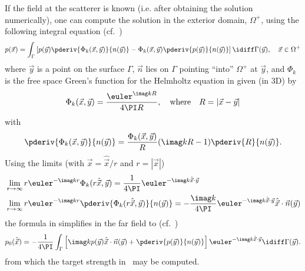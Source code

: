 If the field at the scatterer is known (i.e. after obtaining the solution numerically), one can compute the solution in the exterior domain, $\Omega^+$, using the following integral equation (cf.~\cite[Theorem 2.21]{Chandler_Wilde2012nab})
\begin{equation}\label{Eq:KirchhoffIntegral}
	p(\vec{x}) = \int_{\Gamma}\left[ p(\vec{y})\pderiv{\Phi_k(\vec{x},\vec{y})}{n(\vec{y})} - \Phi_k(\vec{x},\vec{y})\pderiv{p(\vec{y})}{n(\vec{y})}\right]\idiff \Gamma(\vec{y}),\quad\vec{x}\in\Omega^+
\end{equation}
where $\vec{y}$ is a point on the surface $\Gamma$, $\vec{n}$ lies on $\Gamma$ pointing ``into'' $\Omega^+$ at $\vec{y}$, and $\Phi_k$ is the free space Green's function for the Helmholtz equation in  given (in 3D) by
\begin{equation}\label{Eq:FreeSpaceGrensFunction}
	\Phi_k(\vec{x},\vec{y}) = \frac{\euler^{\imag kR}}{4\PI R},\quad\text{where}\quad R = |\vec{x} - \vec{y}|
\end{equation} 
with
\begin{equation*}
	\pderiv{\Phi_k(\vec{x},\vec{y})}{n(\vec{y})} = \frac{\Phi_k(\vec{x},\vec{y})}{R}(\imag kR-1)\pderiv{R}{n(\vec{y})}.
\end{equation*}
Using the limits (with $\vec{x}=\hat{\vec{x}}/r$ and $r=|\vec{x}|$)
\begin{equation}\label{Eq:Phi_k_limits}
\begin{aligned}
	&\lim_{r\to\infty} r\euler^{-\imag k r}\Phi_k(r\hat{\vec{x}},\vec{y}) = \frac{1}{4\PI}\euler^{-\imag k \hat{\vec{x}}\cdot\vec{y}}\\
	&\lim_{r\to\infty} r\euler^{-\imag k r}\pderiv{\Phi_k(r\hat{\vec{x}},\vec{y})}{n(\vec{y})} = -\frac{\imag k}{4\PI}\euler^{-\imag k \hat{\vec{x}}\cdot\vec{y}}\hat{\vec{x}}\cdot\vec{n}(\vec{y})
\end{aligned}
\end{equation}
the formula in  simplifies in the far field to (cf.~\cite[p. 32]{Ihlenburg1998fea})
\begin{equation}\label{Eq:HelmholtzIntegralFarField}
	p_0(\hat{\vec{x}}) = -\frac{1}{4\PI}\int_{\Gamma}\left[ \imag k p(\vec{y})\hat{\vec{x}}\cdot\vec{n}(\vec{y}) + \pderiv{p(\vec{y})}{n(\vec{y})}\right]\euler^{-\imag k \hat{\vec{x}}\cdot\vec{y}}\idiff \Gamma(\vec{y}).
\end{equation}
from which the target strength in~ may be computed.

